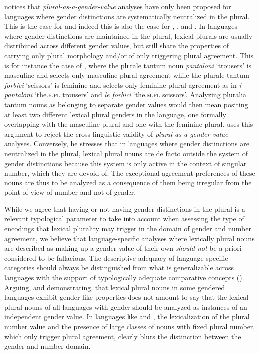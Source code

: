 \documentclass[output=collectionpaper]{langsci/langscibook}
\begin{document}
\cite[237--238]{Corbett2012} notices that \emph{plural-as-a-gender-value} analyses have only been proposed for languages where gender distinctions are systematically neutralized in the plural. This is the case for  and indeed this is also the case for , ,  and . In languages where gender distinctions are maintained in the plural, lexical plurals are usually distributed across different gender values, but still share the properties of carrying only plural morphology and/or of only triggering plural agreement. This is for instance the case of , where the plurale tantum noun \textit{pantaloni} `trousers' is masculine and selects only masculine plural agreement while the plurale tantum \textit{forbici} `scissors' is feminine and selects only feminine plural agreement as in \textit{i pantaloni} `the.\textsc{f.pl} trousers' and \textit{le forbici} `the.\textsc{m.pl} scissors'. Analyzing  pluralia tantum nouns as belonging to separate gender values would then mean positing at least two different lexical plural genders in the language, one formally overlapping with the masculine plural and one with the feminine plural. \cite[237--238]{Corbett2012} uses this argument to reject the cross-linguistic validity of \textit{plural-as-a-gender-value} analyses. Conversely, he stresses that in languages where gender distinctions are neutralized in the plural, lexical plural nouns are de facto outside the system of gender distinctions because this system is only active in the context of singular number, which they are devoid of. The exceptional agreement preferences of these nouns are thus to be analyzed as a consequence of them being irregular from the point of view of number and not of gender.

While we agree that having or not having gender distinctions in the plural is a relevant typological parameter to take into account when assessing the type of encodings that lexical plurality may trigger in the domain of gender and number agreement, we believe that language-specific analyses where lexically plural nouns are described as making up a gender value of their own \emph{should not} be a priori considered to be fallacious. The descriptive adequacy of language-specific categories should always be distinguished from what is generalizable across languages with the support of typologically adequate comparative concepts (\citealt{Haspelmath2010}). Arguing, and demonstrating, that lexical plural nouns in some gendered languages exhibit gender-like properties does not amount to say that the lexical plural nouns of all languages with gender should be analyzed as instances of an independent gender value. In languages like  and , the lexicalization of the plural number value and the presence of large classes of nouns with fixed plural number, which only trigger plural agreement, clearly blurs the distinction between the gender and number domain.
\end{document}

